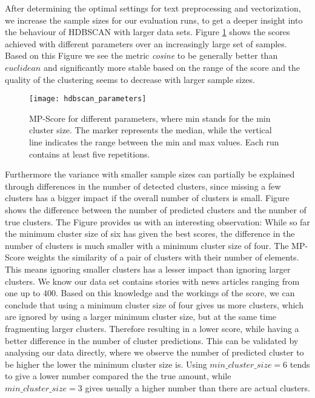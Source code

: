 After determining the optimal settings for text preprocessing and vectorization,
we increase the sample sizes for our evaluation runs,
to get a deeper insight into the behaviour of HDBSCAN with larger data sets.
Figure \ref{fig:hdbscan_parameters} shows the scores achieved with different parameters over an increasingly large set of samples.
Based on this Figure we see the metric \textit{cosine} to be generally better than $euclidean$
and significantly more stable based on the range of the score and the quality of the clustering seems to decrease with larger sample sizes.

\begin{figure}[h]
    \centering
    \texttt{[image: hdbscan\_parameters]}
    \caption{MP-Score for different parameters, where min stands for the min cluster size. The marker represents the median, while the vertical line indicates the range between the min and max values. Each run contains at least five repetitions.}
    \label{fig:hdbscan_parameters}
\end{figure}

Furthermore the variance with smaller sample sizes can partially be explained through differences in the number of detected clusters,
since missing a few clusters has a bigger impact if the overall number of clusters is small.
Figure \label{fig:cluster_difference_samples} shows the difference between the number of predicted clusters and the number of true clusters.
The Figure provides us with an interesting observation:
While so far the minimum cluster size of six has given the best scores,
the difference in the number of clusters is much smaller with a minimum cluster size of four.
The MP-Score weights the similarity of a pair of clusters with their number of elements.
This means ignoring smaller clusters has a lesser impact than ignoring larger clusters.
We know our data set contains stories with news articles ranging from one up to 400.
Based on this knowledge and the workings of the score,
we can conclude that using a minimum cluster size of four gives us more clusters,
which are ignored by using a larger minimum cluster size, but at the same time fragmenting larger clusters.
Therefore resulting in a lower score, while having a better difference in the number of cluster predictions.
This can be validated by analysing our data directly, where we observe the number of predicted cluster to be higher the lower the minimum cluster size is.
Using $min\_cluster\_size=6$ tends to give a lower number compared the the true amount,
while $min\_cluster\_size=3$ gives usually a higher number than there are actual clusters.

